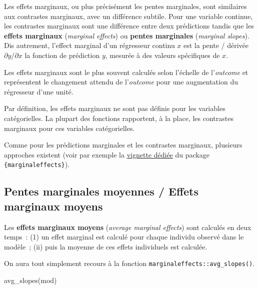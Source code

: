 \documentclass[
  letterpaper,
  DIV=11,
  numbers=noendperiod,
  oneside]{scrreprt}
\newenvironment{Shaded}{\begin{snugshade}}{\end{snugshade}}
\newcommand{\FunctionTok}[1]{\textcolor[rgb]{0.28,0.35,0.67}{#1}}
\newcommand{\NormalTok}[1]{\textcolor[rgb]{0.00,0.23,0.31}{#1}}
\begin{document}
Les effets marginaux, ou plus précisément les pentes marginales, sont
similaires aux contrastes marginaux, avec un différence subtile. Pour
une variable continue, les contrastes marginaux sont une différence
entre deux prédictions tandis que les \textbf{effets marginaux}
(\emph{marginal effects}) ou \textbf{pentes marginales} (\emph{marginal
slopes}). Dis autrement, l'effect marginal d'un régresseur continu \(x\)
est la pente / dérivée \({\partial y}/{\partial x}\) la fonction de
prédiction \(y\), mesurée à des valeurs spécifiques de \(x\).

Les effets marginaux sont le plus souvent calculés selon l'échelle de
l'\emph{outcome} et représentent le changement attendu de
l'\emph{outcome} pour une augmentation du régresseur d'une unité.

Par définition, les effets marginaux ne sont pas définis pour les
variables catégorielles. La plupart des fonctions rapportent, à la
place, les contrastes marginaux pour ces variables catégorielles.

Comme pour les prédictions marginales et les contrastes marginaux,
plusieurs approches existent (voir par exemple la
\href{https://vincentarelbundock.github.io/marginaleffects/articles/slopes.html}{vignette
dédiée} du package \texttt{\{marginaleffects\}}).

\hypertarget{pentes-marginales-moyennes-effets-marginaux-moyens}{%
\subsection{Pentes marginales moyennes / Effets marginaux
moyens}\label{pentes-marginales-moyennes-effets-marginaux-moyens}}

Les \textbf{effets marginaux moyens} (\emph{average marginal effects})
sont calculés en deux temps~: (1) un effet marginal est calculé pour
chaque individu observé dans le modèle~; (ii) puis la moyenne de ces
effets individuels est calculée.

On aura tout simplement recours à la fonction
\texttt{marginaleffects::avg\_slopes()}.

\begin{Shaded}
\begin{Highlighting}[]
\FunctionTok{avg\_slopes}\NormalTok{(mod)}
\end{Highlighting}
\end{Shaded}
\end{document}
